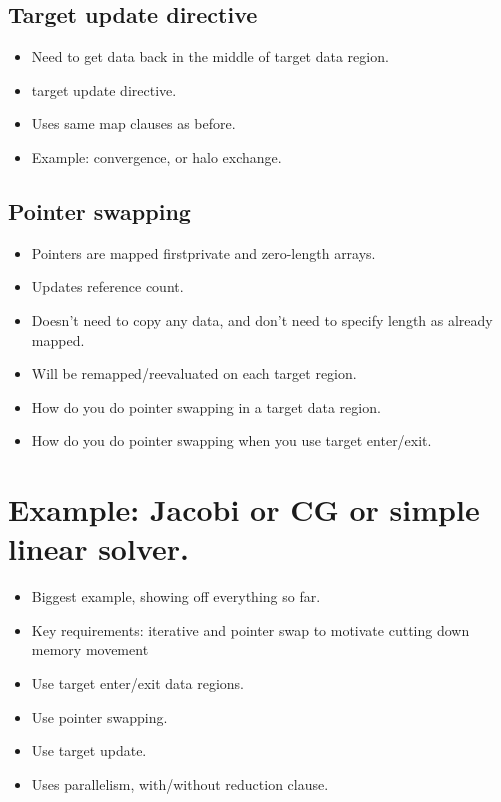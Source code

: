 \subsection{Target update directive}
\begin{itemize}
  \item Need to get data back in the middle of target data region.
  \item target update directive.
  \item Uses same map clauses as before.
  \item Example: convergence, or halo exchange.
\end{itemize}

\subsection{Pointer swapping}
\begin{itemize}
  \item Pointers are mapped firstprivate and zero-length arrays.
  \item Updates reference count.
  \item Doesn't need to copy any data, and don't need to specify length as already mapped.
  \item Will be remapped/reevaluated on each target region.
  \item How do you do pointer swapping in a target data region.
  \item How do you do pointer swapping when you use target enter/exit.
\end{itemize}

\section{Example: Jacobi or CG or simple linear solver.}
\begin{itemize}
  \item Biggest example, showing off everything so far.
  \item Key requirements: iterative and pointer swap to motivate cutting down memory movement
  \item Use target enter/exit data regions.
  \item Use pointer swapping.
  \item Use target update.
  \item Uses parallelism, with/without reduction clause.
\end{itemize}

